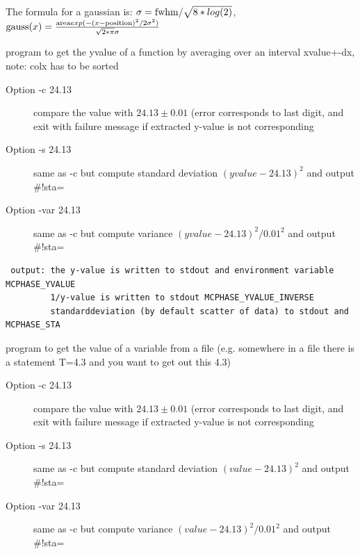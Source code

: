 \begin{description}
The formula for a gaussian is:
$\sigma={\rm fwhm}/\sqrt{8*log(2)}$,
${\rm gauss}(x)=\frac{{\rm area} exp(-(x-{\rm position})^2/2 \sigma^2)}{\sqrt{2*\pi}\sigma}$
\item[\prg getvalue\index{getvalue}\label{getvalue} colx coly xvalue dx filename]
program to get the yvalue of a function by averaging
 over an interval xvalue+-dx,
 note: colx has to be sorted
\begin{description}
\item[Option  -c 24.13 ]  compare the value with $24.13\pm0.01$ (error corresponds to last 
  digit, and exit with failure message if extracted y-value is
                    not corresponding
\item[Option -s 24.13]  same as -c but compute standard deviation $(yvalue-24.13)^2$ and output \#!sta=
\item[Option  -var 24.13]  same as -c but compute variance $(yvalue-24.13)^2/0.01^2$ and output \#!sta=
\end{description}
\begin{verbatim}
 output: the y-value is written to stdout and environment variable MCPHASE_YVALUE
         1/y-value is written to stdout MCPHASE_YVALUE_INVERSE
         standarddeviation (by default scatter of data) to stdout and MCPHASE_STA
\end{verbatim}
\item[\prg getvariable\index{getvariable}\label{getvariable} {[options]} variablename filename]
 program to get the value of a variable from a file 
  (e.g. somewhere in a file there is 
   a statement T=4.3 and you want to get out this 4.3)
\begin{description}
\item[Option  -c 24.13 ]  compare the value with $24.13\pm0.01$ (error corresponds to last 
  digit, and exit with failure message if extracted y-value is
                    not corresponding
\item[Option -s 24.13]  same as -c but compute standard deviation $(value-24.13)^2$ and output \#!sta=
\item[Option  -var 24.13]  same as -c but compute variance $(value-24.13)^2/0.01^2$ and output \#!sta=

\end{description}
\end{description}
